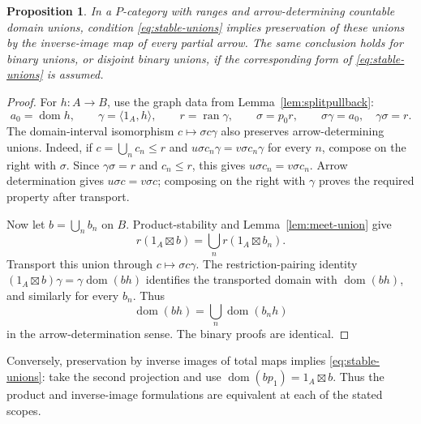 \documentclass[11pt]{article}
\newtheorem{proposition}[theorem]{Proposition}
\newcommand{\dom}{\operatorname{dom}}\newcommand{\ran}{\operatorname{ran}}
\begin{document}
\begin{proposition}\label{prop:inverse-unions}
In a $P$-category with ranges and arrow-determining countable domain unions, condition \eqref{eq:stable-unions} implies preservation of these unions by the inverse-image map of every partial arrow. The same conclusion holds for binary unions, or disjoint binary unions, if the corresponding form of \eqref{eq:stable-unions} is assumed.
\end{proposition}
\begin{proof}
For $h:A\to B$, use the graph data from Lemma~\ref{lem:splitpullback}:
\[
a_0=\dom h,\qquad \gamma=\langle1_A,h\rangle,\qquad
r=\ran\gamma,\qquad \sigma=p_0r,
\qquad \sigma\gamma=a_0,\quad\gamma\sigma=r.
\]
The domain-interval isomorphism $c\mapsto\sigma c\gamma$ also preserves arrow-determining unions. Indeed, if $c=\bigcup_n c_n\leq r$ and
$u\sigma c_n\gamma=v\sigma c_n\gamma$ for every $n$, compose on the right with $\sigma$. Since $\gamma\sigma=r$ and $c_n\leq r$, this gives $u\sigma c_n=v\sigma c_n$. Arrow determination gives $u\sigma c=v\sigma c$; composing on the right with $\gamma$ proves the required property after transport.

Now let $b=\bigcup_n b_n$ on $B$. Product-stability and Lemma~\ref{lem:meet-union} give
\[
r(1_A\boxtimes b)=\bigcup_n r(1_A\boxtimes b_n).
\]
Transport this union through $c\mapsto\sigma c\gamma$.
The restriction-pairing identity
$(1_A\boxtimes b)\gamma=\gamma\dom(bh)$
identifies the transported domain with $\dom(bh)$, and similarly for every $b_n$. Thus
\[
\dom(bh)=\bigcup_n\dom(b_nh)
\]
in the arrow-determination sense. The binary proofs are identical.
\end{proof}

Conversely, preservation by inverse images of total maps implies \eqref{eq:stable-unions}: take the second projection and use
$\dom(bp_1)=1_A\boxtimes b$. Thus the product and inverse-image formulations are equivalent at each of the stated scopes.
\end{document}
